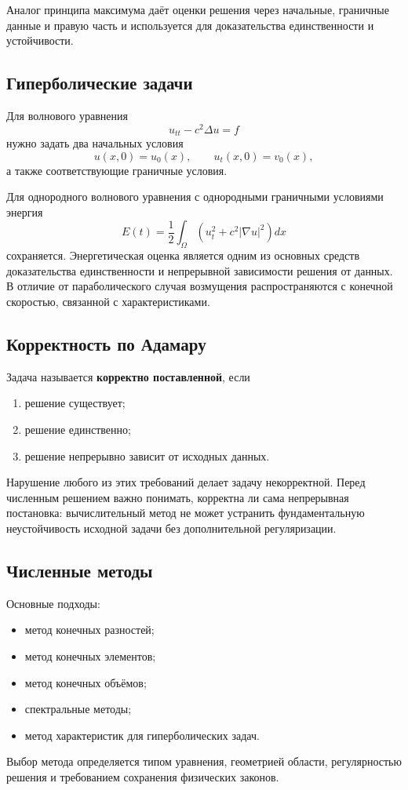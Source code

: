 Аналог принципа максимума даёт оценки решения через начальные, граничные
данные и правую часть и используется для доказательства единственности и
устойчивости.

\subsection{Гиперболические задачи}

Для волнового уравнения
\[
u_{tt}-c^2\Delta u=f
\]
нужно задать два начальных условия
\[
u(x,0)=u_0(x),
\qquad
u_t(x,0)=v_0(x),
\]
а также соответствующие граничные условия.

Для однородного волнового уравнения с однородными граничными условиями
энергия
\[
\boxed{
E(t)=\frac12\int_\Omega
\left(u_t^2+c^2|\nabla u|^2\right)dx
}
\]
сохраняется. Энергетическая оценка является одним из основных средств
доказательства единственности и непрерывной зависимости решения от данных.
В отличие от параболического случая возмущения распространяются с конечной
скоростью, связанной с характеристиками.

\subsection{Корректность по Адамару}

Задача называется \textbf{корректно поставленной}, если
\begin{enumerate}
    \item решение существует;
    \item решение единственно;
    \item решение непрерывно зависит от исходных данных.
\end{enumerate}
Нарушение любого из этих требований делает задачу некорректной. Перед
численным решением важно понимать, корректна ли сама непрерывная
постановка: вычислительный метод не может устранить фундаментальную
неустойчивость исходной задачи без дополнительной регуляризации.

\subsection{Численные методы}

Основные подходы:
\begin{itemize}
    \item метод конечных разностей;
    \item метод конечных элементов;
    \item метод конечных объёмов;
    \item спектральные методы;
    \item метод характеристик для гиперболических задач.
\end{itemize}
Выбор метода определяется типом уравнения, геометрией области,
регулярностью решения и требованием сохранения физических законов.

